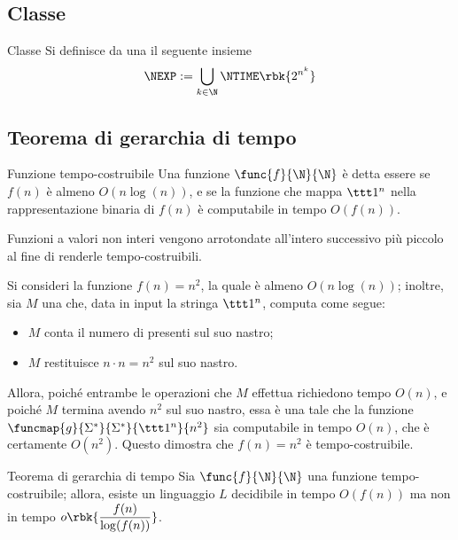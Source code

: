 \documentclass[a4paper, 12pt]{report}
\begin{document}
    \subsection{Classe \NEXP}

    \begin{frameddefn}{Classe \NEXP}
        Si definisce  da una \NTM il seguente insieme $$\NEXP := \bigcup_{k \in \N}{\NTIME \rbk{2^{n^k}}}$$
    \end{frameddefn}

    \subsection{Teorema di gerarchia di tempo}

    \begin{frameddefn}{Funzione tempo-costruibile}
        Una funzione $\func{f}{\N}{\N}$ è detta essere  se $f(n)$ è almeno $O(n \log(n))$, e se la funzione che mappa $\ttt 1 ^n$ nella rappresentazione binaria di $f(n)$ è computabile in tempo $O(f(n))$.

        Funzioni a valori non interi vengono arrotondate all'intero successivo più piccolo al fine di renderle tempo-costruibili.
    \end{frameddefn}

    \begin{example}
        Si consideri la funzione $f(n) = n^2$, la quale è almeno $O(n \log(n))$; inoltre, sia $M$ una \TM che, data in input la stringa $\ttt 1 ^n$, computa come segue:

        \begin{itemize}
            \item $M$ conta il numero di  presenti sul suo nastro;
            \item $M$ restituisce $n \cdot n = n^2$ sul suo nastro.
        \end{itemize}

        Allora, poiché entrambe le operazioni che $M$ effettua richiedono tempo $O(n)$, e poiché $M$ termina avendo $n^2$ sul suo nastro, essa è una \TM tale che la funzione $\funcmap{g}{\Sigma^*}{\Sigma^*}{\ttt 1^n}{n^2}$ sia computabile in tempo $O(n)$, che è certamente $O(n^2)$. Questo dimostra che $f(n) = n^2$ è tempo-costruibile.
    \end{example}

    \begin{framedthm}[label={hier time thm}]{Teorema di gerarchia di tempo}
        Sia $\func{f}{\N}{\N}$ una funzione tempo-costruibile; allora, esiste un linguaggio $L$ decidibile in tempo $O(f(n))$ ma non in tempo $o\rbk{\dfrac{f(n)}{\log(f(n))}}$.
    \end{framedthm}
\end{document}
